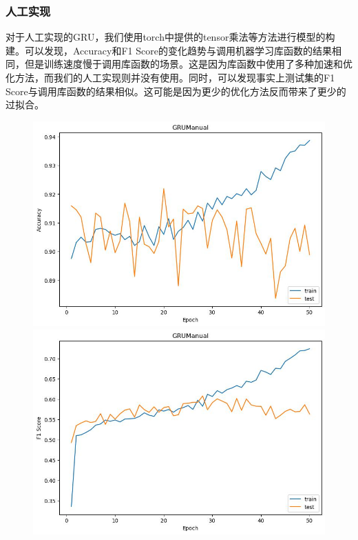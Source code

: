 \documentclass[UTF8]{article}
\begin{document}
\subsubsection{人工实现}
对于人工实现的GRU，我们使用torch中提供的tensor乘法等方法进行模型的构建。可以发现，Accuracy和F1 Score的变化趋势与调用机器学习库函数的结果相同，但是训练速度慢于调用库函数的场景。这是因为库函数中使用了多种加速和优化方法，而我们的人工实现则并没有使用。同时，可以发现事实上测试集的F1 Score与调用库函数的结果相似。这可能是因为更少的优化方法反而带来了更少的过拟合。
\begin{figure}[h]
    \centering
    \begin{minipage}{.43\linewidth}
        \centering
        \includegraphics[width=\linewidth]{../figure/GRUManual_Accuracy.jpg}
    \end{minipage}
    \begin{minipage}{.43\linewidth}
        \centering
        \includegraphics[width=\linewidth]{../figure/GRUManual_F1.jpg}
    \end{minipage}


\end{figure}
\end{document}
